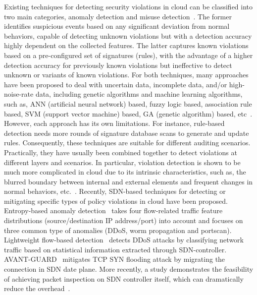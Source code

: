 \documentclass[12pt]{article}
\begin{document}
Existing techniques for detecting security violations in cloud can be
classified into two main categories, anomaly detection and misuse
detection~\cite{Modi201342,5380611,6158820}. The former identifies
suspicious events based on any significant deviation from  normal
behaviors, capable of detecting unknown violations but with a
detection accuracy highly dependent on the collected features. The
latter captures known violations based on a pre-configured set of
signatures (rules), with the advantage of a higher detection accuracy
for previously known violations but ineffective to detect unknown or
variants of known violations. For both techniques, many approaches
have been proposed to deal with uncertain data, incomplete data,
and/or high-noise-rate data, including genetic algorithms and machine
learning algorithms, such as, ANN (artificial neural network) based,
fuzzy logic based, association rule based, SVM (support vector
machine) based, GA (genetic algorithm) based,
etc~\cite{IDAS,Kabiri05researchon}. However, each approach has its own
limitations. For instance, rule-based detection needs more rounds of
signature database scans to generate and update rules. Consequently,
these techniques are suitable for different auditing
scenarios. Practically, they have usually been combined together to
detect violations at different layers and scenarios. In particular,
violation detection is shown to be much more complicated in cloud due
to its intrinsic characteristics, such as, the blurred boundary
between internal and external elements and frequent changes in normal
behaviors, etc.~\cite{Xu:2011:AMI:2603384.2603385}. Recently,
SDN-based techniques for detecting or mitigating specific types of
policy violations in cloud have been proposed. Entropy-based anomaly
detection~\cite{Giotis2014122} takes four flow-related traffic feature
distributions (source/destination IP address/port) into account and
focuses on three common type of anomalies (DDoS, worm propagation and
portscan). Lightweight flow-based detection~\cite{5735752} detects
DDoS attacks by classifying network traffic based on statistical
information extracted through SDN-controller.
AVANT-GUARD~\cite{Shin:2013:ASV:2508859.2516684} mitigates TCP SYN
flooding attack by migrating the connection in SDN date plane. More
recently, a study demonstrates the feasibility of achieving packet
inspection on SDN controller itself, which can dramatically reduce the
overhead~\cite{hommes-thesis}.
\end{document}
